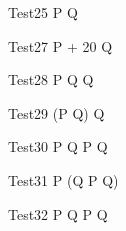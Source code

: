 
\begin{circus}
   \circprocess Test25 \circdef  P \circtimedinterrupt {} \rcirctime Q  \\
\end{circus}


 
\begin{circus}
   \circprocess Test27 \circdef  P \circtimedinterrupt {} + 20 \rcirctime Q  \\
\end{circus}


\begin{circus}
    \circprocess Test28 \circdef  P \circseq Q \circtimedinterrupt {} \rcirctime Q  \\
\end{circus}
 
\begin{circus}
    \circprocess Test29 \circdef  (P \circseq Q) \circtimedinterrupt {} \rcirctime Q \\
\end{circus}

\begin{circus}
   \circprocess Test30 \circdef  P \circseq Q \circtimedinterrupt {} \rcirctime  P \circseq Q \\
\end{circus}
 
\begin{circus}
    \circprocess Test31 \circdef  P \circseq (Q \circtimedinterrupt {} \rcirctime P \circseq Q)\\
\end{circus}

\begin{circus}
    \circprocess Test32 \circdef  P \circtimedinterrupt {} \rcirctime Q \circtimedinterrupt {} \rcirctime P \circseq Q\\
\end{circus}


 

